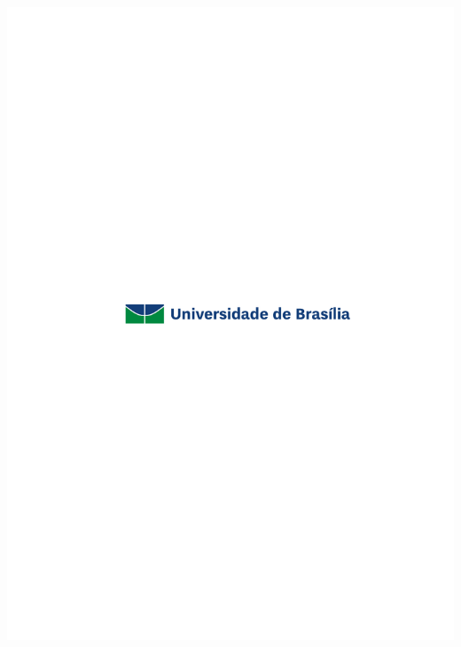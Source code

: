 \documentclass[
  letterpaper,
  a4paper,
  12pt]{scrbook}
\begin{document}
\begin{frontmatter}
\begin{titlepage}
\newcommand{\affiliationblock}{{\titlepageaffiliationblock}

\vspace{0pt}
}

\newcommand{\logoblock}{{\includegraphics[width=1.0\textwidth]{imgs/logo.pdf}}

\vspace{2cm}
}

\newcommand{\footerblock}{}

\newcommand{\dateblock}{}

\newcommand{\headerblock}{}

\thispagestyle{empty} %


\newlength{\minipagewidth}
\setlength{\minipagewidth}{\textwidth}
\raggedright %
\begin{minipage}[b][\textheight][s]{\minipagewidth}
\titlepagepagealign
\logoblock


\end{minipage}
\end{titlepage}
\end{frontmatter}
\end{document}

